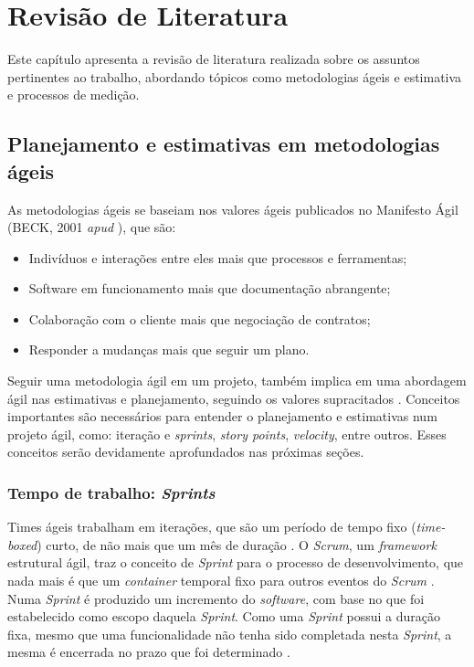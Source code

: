 \chapter{Revisão de Literatura}

  Este capítulo apresenta a revisão de literatura realizada sobre os assuntos pertinentes ao trabalho, abordando
  tópicos como metodologias ágeis e estimativa e processos de medição.

\section{Planejamento e estimativas em metodologias ágeis}

  As metodologias ágeis se baseiam nos valores ágeis publicados no Manifesto Ágil
  (BECK, 2001 \textit{apud} ), que são:

  \begin{itemize}
   \item Indivíduos e interações entre eles mais que processos e ferramentas;
   \item Software em funcionamento mais que documentação abrangente;
   \item Colaboração com o cliente mais que negociação de contratos;
   \item Responder a mudanças mais que seguir um plano.
  \end{itemize}

 Seguir uma metodologia ágil em um projeto, também implica em uma abordagem ágil nas estimativas e planejamento, seguindo
 os valores supracitados \cite{cohn06}. Conceitos importantes são necessários para entender o planejamento e estimativas
 num projeto ágil, como: iteração e \textit{sprints}, \textit{story points}, \textit{velocity}, entre outros.
 Esses conceitos serão devidamente aprofundados nas próximas seções.

  \subsection{Tempo de trabalho: \textit{Sprints}}

    Times ágeis trabalham em iterações, que são um período de tempo fixo (\textit{time-boxed}) curto, de não mais que
    um mês de duração \cite{cohn06} \cite{scrum13}. O \textit{Scrum}, um \textit{framework} estrutural ágil,
    traz o conceito de \textit{Sprint} para o processo de desenvolvimento, que nada mais é que um \textit{container}
    temporal fixo para outros eventos do \textit{Scrum} \cite{scrum13}. Numa \textit{Sprint} é produzido um incremento
    do \textit{software}, com base no que foi estabelecido como escopo daquela \textit{Sprint}. Como uma \textit{Sprint} possui
    a duração fixa, mesmo que uma funcionalidade não tenha sido completada nesta \textit{Sprint}, a mesma é encerrada no prazo
    que foi determinado \cite{cohn06}.

